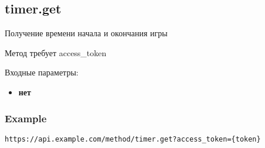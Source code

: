 \subsection{timer.get}
Получение времени начала и окончания игры

Метод требует access\_token

Входные параметры:
\begin{itemize}
  \item \textbf{нет}
\end{itemize}

\subsubsection{Example}
\begin{Verbatim}[frame=single]
https://api.example.com/method/timer.get?access_token={token}
\end{Verbatim}